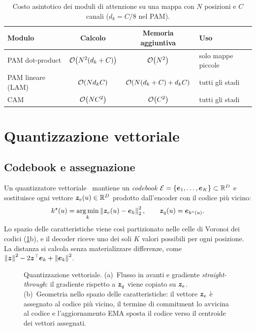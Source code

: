 \begin{table}[t]
  \centering
  \small
  \caption[Costo dei moduli di attenzione]{Costo asintotico dei moduli di attenzione su una
    mappa con $N$ posizioni e $C$ canali ($d_k=C/8$ nel PAM).}
  \label{tab:costo-attenzione}
  \begin{tabular}{|l|c|c|l|}
    \hline
    \textbf{Modulo} & \textbf{Calcolo} & \textbf{Memoria aggiuntiva} & \textbf{Uso} \\
    \hline
    PAM dot-product & $\mathcal{O}\!\left(N^2(d_k+C)\right)$ & $\mathcal{O}\!\left(N^2\right)$ & solo mappe piccole \\
    PAM lineare (LAM) & $\mathcal{O}\!\left(N d_k C\right)$ & $\mathcal{O}\!\left(N(d_k+C)+d_kC\right)$ & tutti gli stadi \\
    CAM & $\mathcal{O}\!\left(NC^2\right)$ & $\mathcal{O}\!\left(C^2\right)$ & tutti gli stadi \\
    \hline
  \end{tabular}
\end{table}

\section{Quantizzazione vettoriale}
\label{sec:vq}

\subsection{Codebook e assegnazione}

Un quantizzatore vettoriale~\cite{vandenoord2017vqvae} mantiene un \emph{codebook}
$\mathcal{E}=\{\bm{e}_1,\dots,\bm{e}_K\}\subset\mathbb{R}^{D}$ e sostituisce ogni vettore
$\bm{z}_e(u)\in\mathbb{R}^{D}$ prodotto dall'encoder con il codice più vicino:
\begin{equation}
  k^\star(u)=\operatorname*{arg\,min}_{k}\left\lVert \bm{z}_e(u)-\bm{e}_k \right\rVert_2^2,
  \qquad
  \bm{z}_q(u)=\bm{e}_{k^\star(u)} .
  \label{eq:vq-assegnazione}
\end{equation}
Lo spazio delle caratteristiche viene così partizionato nelle celle di Voronoi dei codici
(\cref{fig:vq}b), e il decoder riceve uno dei soli $K$ valori possibili per ogni posizione. La
distanza si calcola senza materializzare differenze, come
$\left\lVert \bm{z} \right\rVert^2-2\bm{z}^{\top}\bm{e}_k+\left\lVert \bm{e}_k \right\rVert^2$.

\begin{figure}[t]
  \centering
  \resizebox{\linewidth}{!}{}
  \caption[Quantizzazione vettoriale]{Quantizzazione vettoriale. (a)~Flusso in avanti e
    gradiente \emph{straight-through}: il gradiente rispetto a $\bm{z}_q$ viene copiato su
    $\bm{z}_e$. (b)~Geometria nello spazio delle caratteristiche: il vettore $\bm{z}_e$ è
    assegnato al codice più vicino, il termine di commitment lo avvicina al codice e
    l'aggiornamento EMA sposta il codice verso il centroide dei vettori assegnati.}
  \label{fig:vq}
\end{figure}

